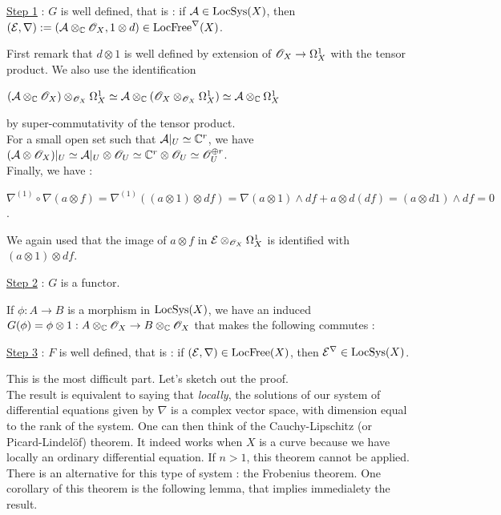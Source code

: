 \begin{mydemo}

\underline{Step 1} :  $G$ is well defined, that is : if $\mathcal{A} \in \text{LocSys}(X)$, then $(\mathcal{E},\nabla) := (\mathcal{A} \otimes_{\mathbb{C}} \mathscr{O}_X,1\otimes d) \in \text{LocFree}^\nabla(X)$.

\smallskip
First remark that $d\otimes 1$ is well defined by extension of $\mathscr{O}_X \to \Omega^1_X$ with the tensor product. We also use the identification 
\begin{center}
$(\mathcal{A} \otimes_{\mathbb{C}} \mathscr{O}_X)\otimes_{\mathscr{O}_X} \Omega^1_X \simeq \mathcal{A} \otimes_{\mathbb{C}} (\mathscr{O}_X \otimes_{\mathscr{O}_X} \Omega^1_X) \simeq \mathcal{A} \otimes_{\mathbb{C}} \Omega^1_X$
\end{center} by super-commutativity of the tensor product.\\
For a small open set such that $\mathcal{A}|_U \simeq \mathbb{C}^r$, we have $(\mathcal{A} \otimes \mathscr{O}_X)|_U \simeq \mathcal{A}|_U \otimes \mathscr{O}_U \simeq \mathbb{C}^r \otimes \mathscr{O}_U \simeq \mathscr{O}_U^{\oplus r}$.\\
Finally, we have :
\begin{center}
$\nabla^{(1)} \circ \nabla (a\otimes f) = \nabla^{(1)} ((a \otimes 1) \otimes df) = \nabla(a \otimes 1) \wedge df + a \otimes d(df) = (a \otimes d1) \wedge df = 0$.
\end{center}
We again used that the image of $a \otimes f$ in $\mathcal{E} \otimes_{\mathscr{O}_X} \Omega^1_X$ is identified with $(a \otimes 1) \otimes df$.


\underline{Step 2} : $G$ is a functor.

\smallskip
If $\phi : A \to B$ is a morphism in $\text{LocSys}(X)$, we have an induced $G(\phi) = \phi \otimes 1 : A \otimes_{\mathbb{C}} \mathscr{O}_X \to B \otimes_{\mathbb{C}} \mathscr{O}_X$ that makes the following commutes :
\begin{center}
\end{center}


\underline{Step 3} : $F$ is well defined, that is : if $(\mathcal{E},\nabla) \in \text{LocFree}(X)$, then $\mathcal{E}^\nabla \in \text{LocSys}(X)$.

\smallskip
This is the most difficult part. Let's sketch out the proof.\\
The result is equivalent to saying that \textit{locally}, the solutions of our system of differential equations given by $\nabla$ is a complex vector space, with dimension equal to the rank of the system. One can then think of the Cauchy-Lipschitz (or Picard-Lindelöf) theorem. It indeed works when $X$ is a curve because we have locally an ordinary differential equation. If $n>1$, this theorem cannot be applied.\\
There is an alternative for this type of system : the Frobenius theorem. One corollary of this theorem is the following lemma, that implies immedialety the result.


\end{mydemo}

